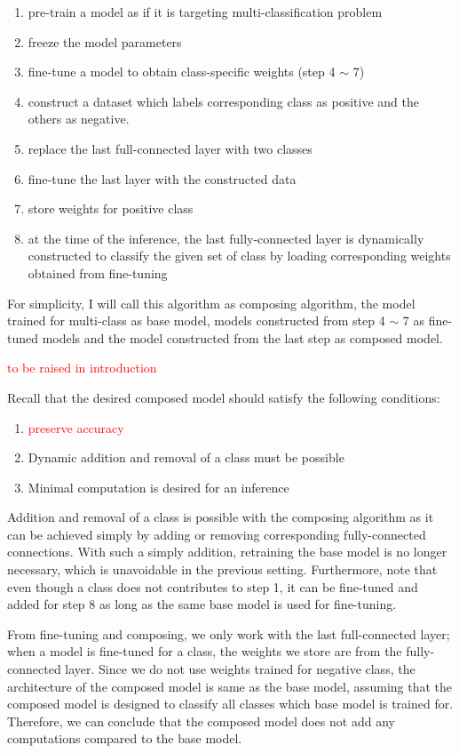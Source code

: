 \documentclass{article}
\newcommand{\red}[1]{\textcolor{red}{#1}}
\begin{document}
\begin{enumerate}
	\item pre-train a model as if it is targeting multi-classification problem
	\item freeze the model parameters
	\item fine-tune a model to obtain class-specific weights (step 4 $\sim$ 7)
	\item construct a dataset which labels corresponding class as positive and the others as negative.
	\item replace the last full-connected layer with two classes
	\item fine-tune the last layer with the constructed data
	\item store weights for positive class
	\item at the time of the inference, the last fully-connected layer is dynamically constructed to classify the given set of class by loading corresponding weights obtained from fine-tuning
\end{enumerate}

For simplicity, I will call this algorithm as composing algorithm, the model trained for multi-class as base model, models constructed from step 4 $\sim$ 7 as fine-tuned models and the model constructed from the last step as composed model.

\red{to be raised in introduction}

Recall that the desired composed model should satisfy the following conditions:

\begin{enumerate}
	\item \red{preserve accuracy}
	\item Dynamic addition and removal of a class must be possible
	\item Minimal computation is desired for an inference
\end{enumerate}

Addition and removal of a class is possible with the composing algorithm as it can be achieved simply by adding or removing corresponding fully-connected connections.
With such a simply addition, retraining the base model is no longer necessary, which is unavoidable in the previous setting. Furthermore, note that even though a class does not contributes to step 1, it can be fine-tuned and added for step 8 as long as the same base model is used for fine-tuning.

From fine-tuning and composing, we only work with the last full-connected layer; when a model is fine-tuned for a class, the weights we store are from the fully-connected layer.
Since we do not use weights trained for negative class, the architecture of the composed model is same as the base model, assuming that the composed model is designed to classify all classes which base model is trained for. Therefore, we can conclude that the composed model does not add any computations compared to the base model.
\end{document}
